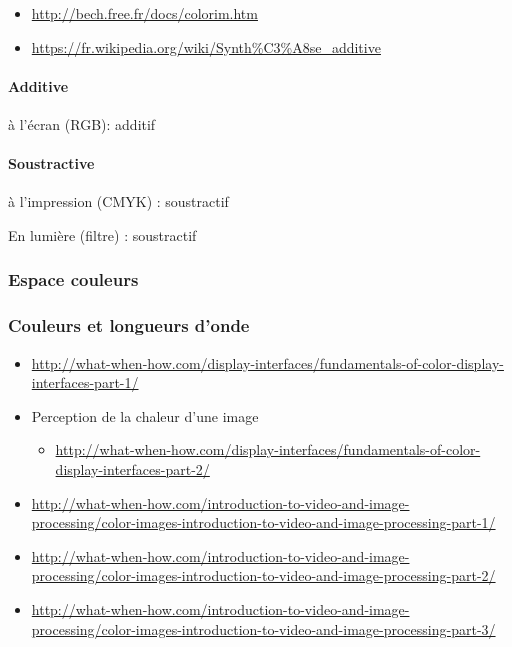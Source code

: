 \documentclass[
  french,
]{book}
\providecommand{\tightlist}{%
  \setlength{\itemsep}{0pt}\setlength{\parskip}{0pt}}
\begin{document}
\begin{itemize}
\item
  \url{http://bech.free.fr/docs/colorim.htm}
\item
  \url{https://fr.wikipedia.org/wiki/Synth\%C3\%A8se_additive}
\end{itemize}

\hypertarget{additive}{%
\paragraph{Additive}\label{additive}}

à l'écran (RGB): additif

\hypertarget{soustractive}{%
\paragraph{Soustractive}\label{soustractive}}

à l'impression (CMYK) : soustractif

En lumière (filtre) : soustractif

\hypertarget{espace-couleurs}{%
\subsubsection{Espace couleurs}\label{espace-couleurs}}

\hypertarget{couleurs-et-longueurs-donde}{%
\subsubsection{Couleurs et longueurs d'onde}\label{couleurs-et-longueurs-donde}}

\begin{itemize}
\tightlist
\item
  \url{http://what-when-how.com/display-interfaces/fundamentals-of-color-display-interfaces-part-1/}
\item
  Perception de la chaleur d'une image

  \begin{itemize}
  \tightlist
  \item
    \url{http://what-when-how.com/display-interfaces/fundamentals-of-color-display-interfaces-part-2/}
  \end{itemize}
\item
  \url{http://what-when-how.com/introduction-to-video-and-image-processing/color-images-introduction-to-video-and-image-processing-part-1/}
\item
  \url{http://what-when-how.com/introduction-to-video-and-image-processing/color-images-introduction-to-video-and-image-processing-part-2/}
\item
  \url{http://what-when-how.com/introduction-to-video-and-image-processing/color-images-introduction-to-video-and-image-processing-part-3/}
\end{itemize}
\end{document}
